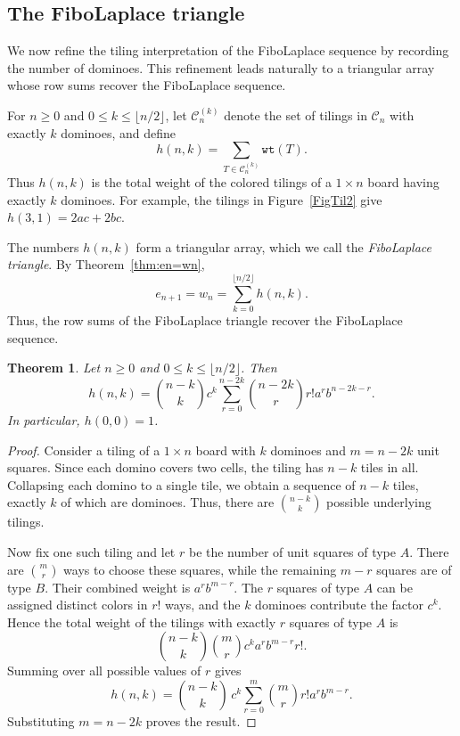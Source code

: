 \documentclass[11pt]{amsart}
\newcommand{\wt}{{\texttt{wt}}}
\theoremstyle{plain}
\numberwithin{equation}{section}
\newtheorem{theorem}[thm]{Theorem}
\begin{document}
\subsection{The FiboLaplace triangle}

We now refine the tiling interpretation of the FiboLaplace sequence by recording the number of dominoes. This refinement leads naturally to a triangular array whose row sums recover the FiboLaplace sequence.

For $n\geq 0$ and $0\leq k\leq \lfloor n/2\rfloor$, let $\mathcal C_n^{(k)}$ denote the set of tilings in $\mathcal C_n$ with
exactly $k$ dominoes, and define
\[
h(n,k)=\sum_{T\in\mathcal C_n^{(k)}}\wt(T).
\]
Thus $h(n,k)$ is the total weight of the colored tilings of a $1\times n$ board having exactly $k$ dominoes. For example, the tilings
in Figure~\ref{FigTil2} give  $
h(3,1)=2ac+2bc$.

The numbers $h(n,k)$ form a triangular array, which we call the
\emph{FiboLaplace triangle}. By Theorem~\ref{thm:en=wn},
\[
e_{n+1}=w_n=\sum_{k=0}^{\lfloor n/2\rfloor}h(n,k).
\]
Thus, the row sums of the FiboLaplace triangle recover the FiboLaplace sequence.

\begin{theorem}\label{thm:h-n-k}
Let $n\geq 0$ and $0\leq k\leq \lfloor n/2\rfloor$. Then
\[
h(n,k)
=
\binom{n-k}{k}c^k
\sum_{r=0}^{n-2k}
\binom{n-2k}{r}r!a^r b^{n-2k-r}.
\]
In particular, $h(0,0)=1$.
\end{theorem}
\begin{proof}
Consider a tiling of a $1\times n$ board with $k$ dominoes and  $m=n-2k$  unit squares. Since each domino covers two cells, the tiling
has $n-k$ tiles in all. Collapsing each domino to a single tile, we
obtain a sequence of $n-k$ tiles, exactly $k$ of which are dominoes.
Thus, there are  $\binom{n-k}{k}$ possible underlying tilings.


Now fix one such tiling and let $r$ be the number of unit squares of type $A$.  There are $\binom{m}{r}$ ways to choose these squares, while
the remaining $m-r$ squares are of type $B$. Their combined weight is 
$a^r b^{m-r}$.  The $r$ squares of type $A$ can be assigned distinct colors in $r!$
ways, and the $k$ dominoes contribute the factor $c^k$. Hence the total weight of the tilings with exactly $r$ squares of type $A$ is
\[
\binom{n-k}{k}\binom{m}{r}c^k a^r b^{m-r} r!.
\]
Summing over all possible values of $r$ gives
\[
h(n,k)
=\binom{n-k}{k}\,c^k\sum_{r=0}^{m}\binom{m}{r}r!a^r b^{m-r}.
\]
Substituting $m=n-2k$ proves the result. 
\end{proof}
\end{document}
